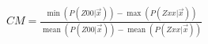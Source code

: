 \documentclass{standalone}
\DeclareMathOperator{\mean}{mean}
\begin{document}
$CM = \frac{\min(P(Z00|\vec{x}))-\max(P(Zxx|\vec{x}))}{\mean(P(Z00|\vec{x}))-\mean(P(Zxx|\vec{x}))}$
\end{document}
